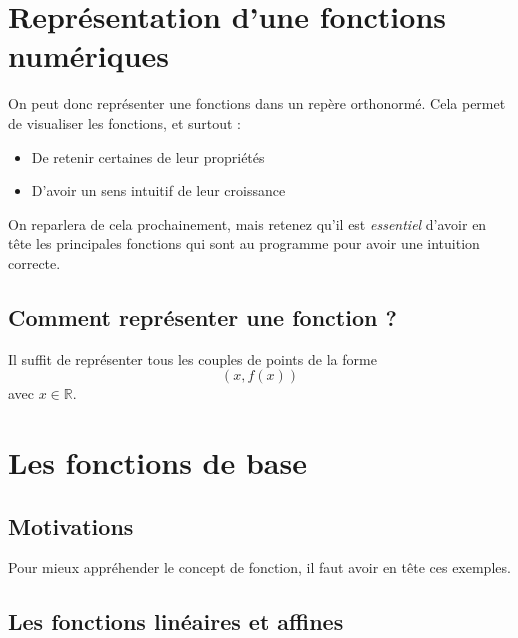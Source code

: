 \documentclass[french,]{article}
\providecommand{\tightlist}{%
  \setlength{\itemsep}{0pt}\setlength{\parskip}{0pt}}
\begin{document}
\hypertarget{repruxe9sentation-dune-fonctions-numuxe9riques}{%
\section{Représentation d'une fonctions
numériques}\label{repruxe9sentation-dune-fonctions-numuxe9riques}}

On peut donc représenter une fonctions dans un repère orthonormé. Cela
permet de visualiser les fonctions, et surtout :

\begin{itemize}
\tightlist
\item
  De retenir certaines de leur propriétés
\item
  D'avoir un sens intuitif de leur croissance
\end{itemize}

On reparlera de cela prochainement, mais retenez qu'il est
\emph{essentiel} d'avoir en tête les principales fonctions qui sont au
programme pour avoir une intuition correcte.

\hypertarget{comment-repruxe9senter-une-fonction}{%
\subsection{Comment représenter une fonction
?}\label{comment-repruxe9senter-une-fonction}}

Il suffit de représenter tous les couples de points de la forme
\[ (x, f(x))\] avec \(x \in \mathbb{R}\).

\hypertarget{les-fonctions-de-base}{%
\section{Les fonctions de base}\label{les-fonctions-de-base}}

\hypertarget{motivations-1}{%
\subsection{Motivations}\label{motivations-1}}

Pour mieux appréhender le concept de fonction, il faut avoir en tête ces
exemples.

\hypertarget{les-fonctions-linuxe9aires-et-affines}{%
\subsection{Les fonctions linéaires et
affines}\label{les-fonctions-linuxe9aires-et-affines}}
\end{document}
